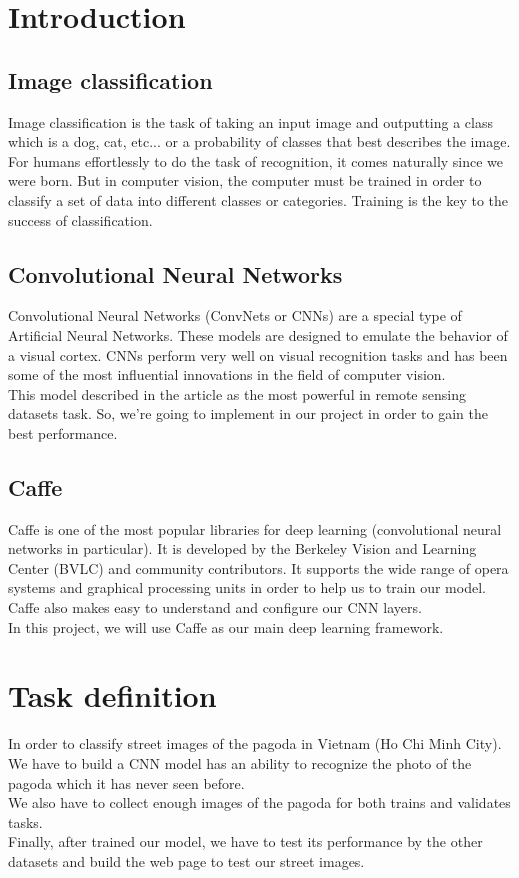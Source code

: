 \documentclass[12pt,a4paper]{article}
\begin{document}
\section{Introduction}
\subsection{Image classification}
Image classification is the task of taking an input image and outputting a class which is a dog, cat, etc... or a probability of classes that best describes the image. For humans effortlessly to do the task of recognition, it comes naturally since we were born. But in computer vision, the computer must be trained in order to classify a set of data into different classes or categories. Training is the key to the success of classification.\\
\subsection{Convolutional Neural Networks}
Convolutional Neural Networks (ConvNets or CNNs) are a special type of Artificial Neural Networks. These models are designed to emulate the behavior of a visual cortex. CNNs perform very well on visual recognition tasks and has been some of the most influential innovations in the field of computer vision.\\
This model described in the article\cite{castelluccio2015land} as the most powerful in remote sensing datasets task. So, we're going to implement in our project in order to gain the best performance. 

\subsection{Caffe}

Caffe is one of the most popular libraries for deep learning (convolutional neural networks in particular). It is developed by the Berkeley Vision and Learning Center (BVLC) and community contributors. It supports the wide range of opera systems and graphical processing units in order to help us to train our model.\\
Caffe also makes easy to understand and configure our CNN layers. \\
In this project, we will use Caffe as our main deep learning framework.

\section{Task definition}
In order to classify street images of the pagoda in Vietnam (Ho Chi Minh City). We have to build a CNN model has an ability to recognize the photo of the pagoda which it has never seen before. \\
We also have to collect enough images of the pagoda for both trains and validates tasks.\\
Finally, after trained our model, we have to test its performance by the other datasets and build the web page to test our street images.
\end{document}
